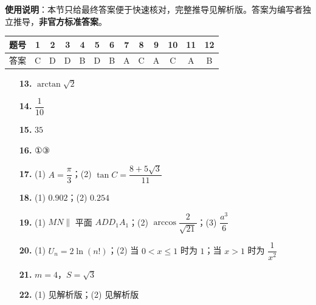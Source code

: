 
\begin{gknotice}
\textbf{使用说明}：本节只给最终答案便于快速核对，完整推导见解析版。答案为编写者独立推导，\textbf{非官方标准答案}。
\end{gknotice}

\begin{center}\begin{tabular}{ccccccccccccc}
\toprule
题号 & 1 & 2 & 3 & 4 & 5 & 6 & 7 & 8 & 9 & 10 & 11 & 12 \\
\midrule
答案 & C & D & D & B & D & B & A & C & A & C & A & B \\
\bottomrule
\end{tabular}\end{center}

\begin{itemize}[leftmargin=2.6em]
  \item[\textbf{13.}] $\arctan\sqrt2$
  \item[\textbf{14.}] $\dfrac1{10}$
  \item[\textbf{15.}] $35$
  \item[\textbf{16.}] ①③
\end{itemize}

\begin{itemize}[leftmargin=2.6em]
  \item[\textbf{17.}] (1) $A=\dfrac\pi3$；(2) $\tan C=\dfrac{8+5\sqrt3}{11}$
  \item[\textbf{18.}] (1) $0.902$；(2) $0.254$
  \item[\textbf{19.}] (1) $MN\parallel$ 平面 $ADD_1A_1$；(2) $\arccos\dfrac2{\sqrt{21}}$；(3) $\dfrac{a^3}{6}$
  \item[\textbf{20.}] (1) $U_n=2\ln(n!)$；(2) 当 $0<x\leqslant1$ 时为 $1$；当 $x>1$ 时为 $\dfrac1{x^2}$
  \item[\textbf{21.}] $m=4$，$S=\sqrt3$
  \item[\textbf{22.}] (1) 见解析版；(2) 见解析版
\end{itemize}
